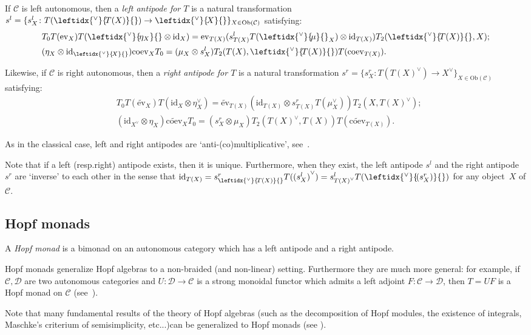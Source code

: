 \documentclass[a4paper]{amsart}
\theoremstyle{definition}
\newcommand{\co}{\colon}
\newcommand{\id}{\mathrm{id}}
\newcommand{\cc}{\mathcal{C}}
\newcommand{\dd}{\mathcal{D}}
\newcommand{\Ob}{\mathrm{Ob}}
\newcommand{\lev}{\mathrm{ev}}
\newcommand{\rev}{\widetilde{\mathrm{ev}}}
\newcommand{\lcoev}{\mathrm{coev}}
\newcommand{\rcoev}{\widetilde{\mathrm{coev}}}
\newcommand{\ldual}[1]{\leftidx{^\vee}{\!#1}{}}
\newcommand{\rdual}[1]{{#1}^\vee}
\begin{document}
If $\cc$ is left autonomous, then a \emph{left antipode for $T$} is a natural transformation $s^l=\{s^l_X\co T(\ldual{T(X)})
\to \ldual{X}\}_{X \in \Ob(\cc)}$ satisfying:
\begin{align*}
& T_0 T(\lev_X)T(\ldual{\eta_X} \otimes \id_X)=\lev_{T(X)}(s^l_{T(X)}T(\ldual{\mu}_X) \otimes
\id_{T(X)})T_2(\ldual{T(X)},X);  \\
& (\eta_X \otimes \id_{\ldual{X}})\lcoev_X T_0=(\mu_X \otimes s^l_X) T_2(T(X),\ldual{T(X)})T(\lcoev_{T(X)}).
\end{align*}

Likewise, if $\cc$ is right autonomous, then a \emph{right antipode for $T$} is a natural transformation $s^r=\{s^r_X\co
T(\rdual{T(X)}) \to \rdual X\}_{X \in \Ob(\cc)}$ satisfying:
\begin{align*}
& T_0 T(\rev_X)T(\id_X \otimes \eta_X^\vee)=\rev_{T(X)}(\id_{T(X)}
\otimes s^r_{T(X)}T(\mu_X^\vee))T_2(X,\rdual{T(X)}); \\
& (\id_{X^\vee}\otimes \eta_X )\rcoev_X T_0=(s^r_X \otimes\mu_X) T_2(\rdual{T(X)},T(X))T(\rcoev_{T(X)}).
\end{align*}

As in the classical case, left and right antipodes are `anti-(co)multiplicative', see~\cite[Theorem~3.7]{BV2}.

Note that if a left (resp.\@ right) antipode exists, then it is unique. Furthermore, when they exist, the left antipode
$s^l$ and the right antipode $s^r$ are `inverse' to each other in the sense that $ \id_{T(X)}=s^r_{\ldual{T(X)}}
T(\rdual{(s_X^l)})=s^l_{\rdual{T(X)}} T(\ldual{(s_X^r)}) $ for any object~$X$ of $\cc$.

\subsection{Hopf monads}\label{sect-hopfmon}
A \emph{Hopf monad} is a bimonad on an autonomous category which has a left antipode and a right antipode.

Hopf monads generalize Hopf algebras to a non-braided (and non-linear) setting. Furthermore they are much more general: for
example, if $\cc,\dd$ are two autonomous categories and $U\co\dd \to \cc$ is a strong monoidal functor which admits a left
adjoint $F\co \cc \to \dd$, then $T=UF$ is a Hopf monad on $\cc$ (see~\cite[corollary~3.15]{BV2}).

Note that many fundamental results of the theory of Hopf algebras (such as the decomposition of Hopf modules, the existence
of integrals, Maschke's criterium of semisimplicity, etc...)\@ can be generalized to Hopf monads (see \cite{BV2}).
\end{document}
